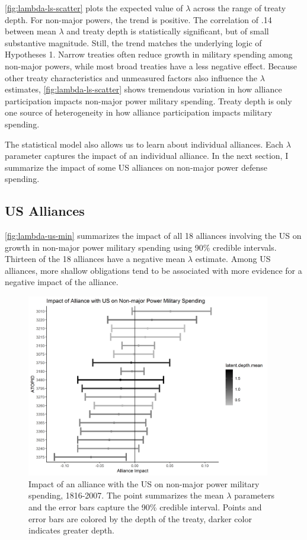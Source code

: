 \documentclass[12pt]{article}
\begin{document}
\autoref{fig:lambda-ls-scatter} plots the expected value of $\lambda$ across the range of treaty depth. 
For non-major powers, the trend is positive.
The correlation of .14 between mean $\lambda$ and treaty depth is statistically significant, but of small substantive magnitude. 
Still, the trend matches the underlying logic of Hypotheses 1. 
Narrow treaties often reduce growth in military spending among non-major powers, while most broad treaties have a less negative effect. 
Because other treaty characteristics and unmeasured factors also influence the $\lambda$ estimates, \autoref{fig:lambda-ls-scatter} shows tremendous variation in how alliance participation impacts non-major power military spending. 
Treaty depth is only one source of heterogeneity in how alliance participation impacts military spending. 


The statistical model also allows us to learn about individual alliances. 
Each $\lambda$ parameter captures the impact of an individual alliance. 
In the next section, I summarize the impact of some US alliances on non-major power defense spending. 

\subsection{US Alliances}

\autoref{fig:lambda-us-min} summarizes the impact of all 18 alliances involving the US on growth in non-major power military spending using 90\% credible intervals. 
Thirteen of the 18 alliances have a negative mean $\lambda$ estimate. 
Among US alliances, more shallow obligations tend to be associated with more evidence for a negative impact of the alliance. 


\begin{figure}[htbp]
	\centering
		\includegraphics[width=0.95\textwidth]{../figures/lambda-us-min.png}
	\caption{Impact of an alliance with the US on non-major power military spending, 1816-2007. The point summarizes the mean $\lambda$ parameters and the error bars capture the 90\% credible interval. Points and error bars are colored by the depth of the treaty, darker color indicates greater depth.}
	\label{fig:lambda-us-min}
\end{figure}
\end{document}
